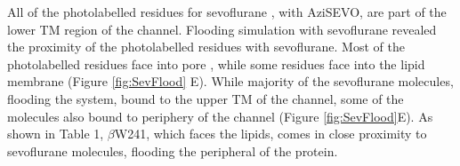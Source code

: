 \documentclass{biophys}
\begin{document}
All of the photolabelled residues for sevoflurane , with AziSEVO\cite{Woll2018a}, are part of the lower TM region of the channel. Flooding simulation with sevoflurane revealed the proximity of the photolabelled residues with sevoflurane. Most of the photolabelled residues face into pore , while some residues face into the lipid membrane (Figure \ref{fig:SevFlood} E). While majority of the sevoflurane molecules, flooding the system, bound to the upper TM of the channel, some of the molecules also bound to periphery of the channel (Figure \ref{fig:SevFlood}E). As shown in Table 1, $\beta$W241, which faces the lipids, comes in close proximity to sevoflurane molecules, flooding the peripheral of the protein.

\end{document}
